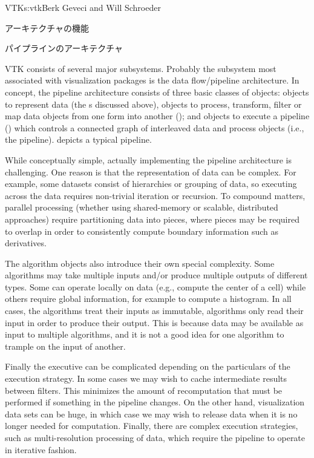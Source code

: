 \begin{aosachapter}{VTK}{s:vtk}{Berk Geveci and Will Schroeder}
\begin{aosasect1}{アーキテクチャの機能}
\begin{aosasect2}{パイプラインのアーキテクチャ}

VTK consists of several major subsystems. Probably the subsystem most
associated with visualization packages is the data flow/pipeline
architecture. In concept, the pipeline architecture consists of three
basic classes of objects: objects to represent data (the
s discussed above), objects to process, transform,
filter or map data objects from one form into another
(); and objects to execute a pipeline
() which controls a connected graph of interleaved
data and process objects (i.e., the
pipeline).  depicts a typical pipeline.


While conceptually simple, actually implementing the pipeline
architecture is challenging. One reason is that the representation of
data can be complex. For example, some datasets consist of hierarchies
or grouping of data, so executing across the data requires non-trivial
iteration or recursion. To compound matters, parallel
processing (whether using shared-memory or scalable, distributed
approaches) require partitioning data into pieces, where pieces may be
required to overlap in order to consistently compute boundary
information such as derivatives.

The algorithm objects also introduce their own special
complexity. Some algorithms may take multiple inputs and/or produce
multiple outputs of different types. Some can operate locally on data
(e.g., compute the center of a cell) while others require global
information, for example to compute a histogram. In all cases, the
algorithms treat their inputs as immutable, algorithms only read their
input in order to produce their output. This is because data may be
available as input to multiple algorithms, and it is not a good idea
for one algorithm to trample on the input of another.

Finally the executive can be complicated depending on the particulars
of the execution strategy. In some cases we may wish to cache
intermediate results between filters. This minimizes the amount of
recomputation that must be performed if something in the pipeline
changes. On the other hand, visualization data sets can be huge, in
which case we may wish to release data when it is no longer needed for
computation. Finally, there are complex execution strategies, such as
multi-resolution processing of data, which require the pipeline to
operate in iterative fashion.


\end{aosasect2}
\end{aosasect1}
\end{aosachapter}
